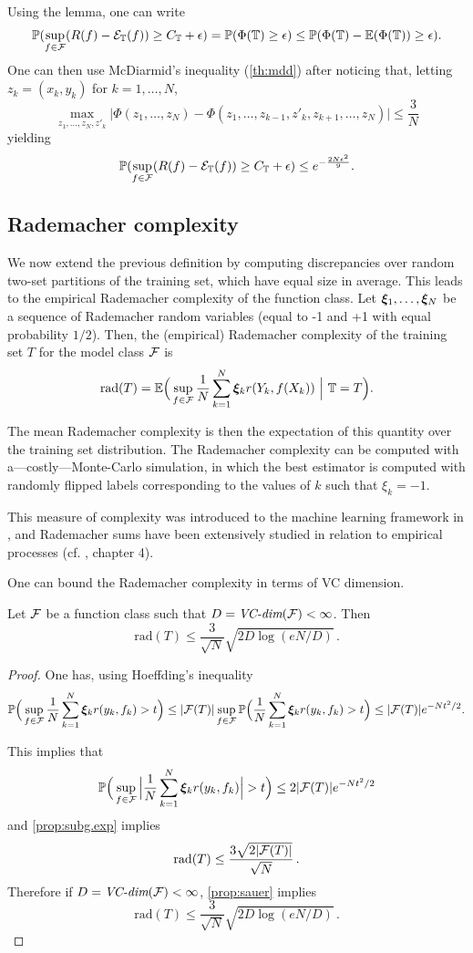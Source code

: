 Using the lemma, one can write
\[
\bm{\mathbb P}(\sup_{f\in{\mathcal F}} (R(f) - {\mathcal E}_{\mathbb T}(f))\geq C_{\mathbb T} + \epsilon) = \bm{\mathbb P}(\Phi({\mathbb T}) \geq \epsilon) \leq \bm{\mathbb P}(\Phi({\mathbb T}) - \bm{\mathbb E}(\Phi({\mathbb T})) \geq \epsilon).
\]
One can then use McDiarmid's inequality (\cref{th:mdd}) after noticing that, letting $z_k = (x_k, y_k)$ for $k=1, \ldots, N$, 
\[
\max_{z_1, \ldots, z_N, z'_k} \big| \Phi(z_1, \ldots, z_N) - \Phi(z_1, \ldots, z_{k-1}, z'_k, z_{k+1}, \ldots, z_N)\big| \leq \frac3N
\]
yielding
\[
\bm{\mathbb P}(\sup_{f\in{\mathcal F}} (R(f) - {\mathcal E}_{\mathbb T}(f))\geq C_{\mathbb T} + \epsilon) \leq e^{-\frac{2N\epsilon^2}9}.
\]

\subsection{Rademacher complexity}
We now extend the previous definition by computing discrepancies over random two-set partitions of the training set, which have equal size in average.
This leads to the  empirical
Rademacher complexity of the function class. Let ${\bm{\xi}}_1, \ldots,
{\bm{\xi}}_N$ be a sequence of Rademacher random variables (equal to -1 and
+1 with equal probability $1/2$). Then, the  (empirical) Rademacher
complexity of the training set $T$ for the model class ${\mathcal F}$ is
$$
\mathrm{rad}(T) = \bm{\mathbb E}\Big(\sup_{f\in{\mathcal F}} \frac{1}{N} \sum_{k=1}^N {\bm{\xi}}_k
r(Y_k, f(X_k))\ \Big|\ {\mathbb T}=T\Big).
$$

The mean Rademacher complexity is then the expectation of this
quantity  over the training set distribution. The Rademacher complexity can be computed with a---costly---Monte-Carlo simulation, in which the best estimator is
computed with randomly flipped labels corresponding to the values of $k$ such that  $\xi_k = -1$. 

This measure of complexity was introduced to the machine learning framework in \citet{koltchinskii2002empirical,bartlett2002rademacher}, and Rademacher sums have been extensively studied in relation to empirical processes (cf. \citet{ledoux1991probability}, chapter 4). 

One can  bound the Rademacher complexity in terms of VC dimension. 
\begin{proposition}
\label{prop:rad.vc}
Let ${\mathcal F}$ be a function class such that  $D= \textit{VC-dim}({\mathcal F}) <\infty$.
Then
\[
\mathrm{rad}(T) \leq \frac{3}{\sqrt N} \sqrt{2D \log(eN/D) }\,.
\]
\end{proposition}
\begin{proof}
One has, using Hoeffding's inequality
\[
\bm{\mathbb P}\Big(\sup_{f\in{\mathcal F}} \frac{1}{N} \sum_{k=1}^N {\bm{\xi}}_k
r(y_k, f_k) > t\Big) \leq  |{\mathcal F}(T)| \sup_{f\in {\mathcal F}} \bm{\mathbb P}\Big(\frac{1}{N} \sum_{k=1}^N {\bm{\xi}}_k
r(y_k, f_k) > t\Big) \leq |{\mathcal F}(T)| e^{-Nt^2/2}.
\]

This implies that 
\[
\bm{\mathbb P}\Big(\sup_{f\in{\mathcal F}} \Big|\frac{1}{N} \sum_{k=1}^N {\bm{\xi}}_k
r(y_k, f_k)\Big| > t\Big) \leq 2 |{\mathcal F}(T)| e^{-Nt^2/2}
\]
and  \cref{prop:subg.exp} implies 
\[
\mathrm{rad}(T) \leq \frac{3 \sqrt{2 |{\mathcal F}(T)|}}{\sqrt N}\,.
\]
Therefore if $D= \textit{VC-dim}({\mathcal F}) <\infty$,  \cref{prop:sauer} implies
\[
\mathrm{rad}(T) \leq \frac{3}{\sqrt N} \sqrt{2D \log(eN/D) }\,.
\]
\end{proof}


